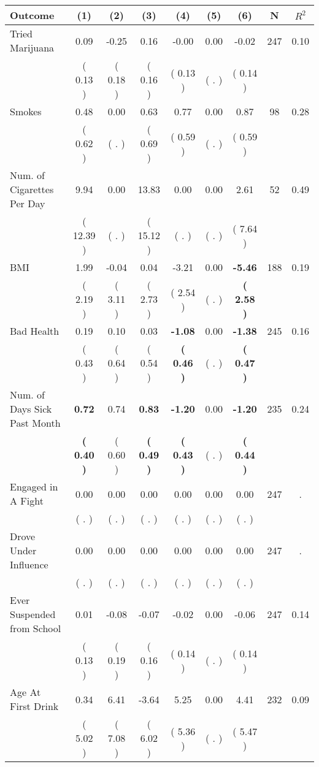 \begin{tabular}{lcccccccc}
\toprule
 \textbf{Outcome} & \textbf{(1)} & \textbf{(2)} & \textbf{(3)} & \textbf{(4)} & \textbf{(5)} & \textbf{(6)} & \textbf{N} & \textbf{$ R^2$} \\
\midrule
Tried Marijuana &      0.09 &     -0.25 &      0.16 &     -0.00 &      0.00 &     -0.02 & 247 &       0.10 \\ 
 & (     0.13 ) & (     0.18 ) & (     0.16 ) & (     0.13 ) & (        . ) & (     0.14 ) & \\
Smokes &      0.48 &      0.00 &      0.63 &      0.77 &      0.00 &      0.87 & 98 &       0.28 \\ 
 & (     0.62 ) & (        . ) & (     0.69 ) & (     0.59 ) & (        . ) & (     0.59 ) & \\
Num. of Cigarettes Per Day &      9.94 &      0.00 &     13.83 &      0.00 &      0.00 &      2.61 & 52 &       0.49 \\ 
 & (    12.39 ) & (        . ) & (    15.12 ) & (        . ) & (        . ) & (     7.64 ) & \\
BMI &      1.99 &     -0.04 &      0.04 &     -3.21 &      0.00 & \textbf{    -5.46} & 188 &       0.19 \\ 
 & (     2.19 ) & (     3.11 ) & (     2.73 ) & (     2.54 ) & (        . ) & \textbf{(     2.58 )} & \\
Bad Health &      0.19 &      0.10 &      0.03 & \textbf{    -1.08} &      0.00 & \textbf{    -1.38} & 245 &       0.16 \\ 
 & (     0.43 ) & (     0.64 ) & (     0.54 ) & \textbf{(     0.46 )} & (        . ) & \textbf{(     0.47 )} & \\
Num. of Days Sick Past Month & \textbf{     0.72} &      0.74 & \textbf{     0.83} & \textbf{    -1.20} &      0.00 & \textbf{    -1.20} & 235 &       0.24 \\ 
 & \textbf{(     0.40 )} & (     0.60 ) & \textbf{(     0.49 )} & \textbf{(     0.43 )} & (        . ) & \textbf{(     0.44 )} & \\
Engaged in A Fight &      0.00 &      0.00 &      0.00 &      0.00 &      0.00 &      0.00 & 247 &          . \\ 
 & (        . ) & (        . ) & (        . ) & (        . ) & (        . ) & (        . ) & \\
Drove Under Influence &      0.00 &      0.00 &      0.00 &      0.00 &      0.00 &      0.00 & 247 &          . \\ 
 & (        . ) & (        . ) & (        . ) & (        . ) & (        . ) & (        . ) & \\
Ever Suspended from School &      0.01 &     -0.08 &     -0.07 &     -0.02 &      0.00 &     -0.06 & 247 &       0.14 \\ 
 & (     0.13 ) & (     0.19 ) & (     0.16 ) & (     0.14 ) & (        . ) & (     0.14 ) & \\
Age At First Drink &      0.34 &      6.41 &     -3.64 &      5.25 &      0.00 &      4.41 & 232 &       0.09 \\ 
 & (     5.02 ) & (     7.08 ) & (     6.02 ) & (     5.36 ) & (        . ) & (     5.47 ) & \\
\bottomrule
\end{tabular}
